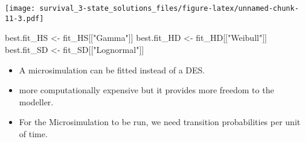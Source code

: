 \documentclass[
]{article}
\newenvironment{Shaded}{\begin{snugshade}}{\end{snugshade}}
\newcommand{\NormalTok}[1]{#1}
\newcommand{\StringTok}[1]{\textcolor[rgb]{0.31,0.60,0.02}{#1}}
\providecommand{\tightlist}{%
  \setlength{\itemsep}{0pt}\setlength{\parskip}{0pt}}
\begin{document}
\texttt{[image: survival\_3-state\_solutions\_files/figure-latex/unnamed-chunk-11-3.pdf]}

\begin{Shaded}
\begin{Highlighting}[]
\NormalTok{best.fit_HS <-}\StringTok{ }\NormalTok{fit_HS[[}\StringTok{"Gamma"}\NormalTok{]]}
\NormalTok{best.fit_HD <-}\StringTok{ }\NormalTok{fit_HD[[}\StringTok{"Weibull"}\NormalTok{]]}
\NormalTok{best.fit_SD <-}\StringTok{ }\NormalTok{fit_SD[[}\StringTok{"Lognormal"}\NormalTok{]]}
\end{Highlighting}
\end{Shaded}

\begin{itemize}
\tightlist
\item
  A microsimulation can be fitted instead of a DES.
\item
  more computationally expensive but it provides more freedom to the
  modeller.
\item
  For the Microsimulation to be run, we need transition probabilities
  per unit of time.
\end{itemize}
\end{document}
